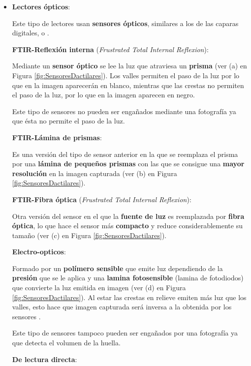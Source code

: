 \begin{itemize}
    \item 
    \textbf{Lectores ópticos}:
    
    Este tipo de lectores usan \textbf{sensores ópticos}, similares a los de las caparas digitales, \textbf{} o \textbf{}.
    
    \textbf{FTIR-Reflexión interna} (\textit{Frustrated Total Internal Reflexion}):
    
    Mediante un \textbf{sensor óptico} se lee la luz que atraviesa un \textbf{prisma} (ver (a) en Figura \ref{fig:SensoresDactilares}). Los valles permiten el paso de la luz por lo que en la imagen aparecerán en blanco, mientras que las crestas no permiten el paso de la luz, por lo que en la imagen aparecen en negro.
    
    Este tipo de sensores no pueden ser engañados mediante una fotografía ya que ésta no permite el paso de la luz. 
    
    \textbf{FTIR-Lámina de prismas}:
    
    Es una versión del tipo de sensor anterior en la que se reemplaza el prisma por una \textbf{lámina de pequeños prismas} con las que se consigue una \textbf{mayor resolución} en la imagen capturada (ver (b) en Figura \ref{fig:SensoresDactilares}).
      
    \textbf{FTIR-Fibra óptica} (\textit{Frustrated Total Internal Reflexion}):
    
    Otra versión del sensor \textbf{} en el que la \textbf{fuente de luz} es reemplazada por \textbf{fibra óptica}, lo que hace el sensor más \textbf{compacto} y reduce considerablemente su tamaño (ver (c) en Figura \ref{fig:SensoresDactilares}). 
    
    \textbf{Electro-opticos}:
    
    Formado por un \textbf{polímero sensible} que emite luz dependiendo de la \textbf{presión} que se le aplica y una \textbf{lamina fotosensible} (lamina de fotodiodos) que convierte la luz emitida en imagen  (ver (d) en Figura \ref{fig:SensoresDactilares}). Al estar las crestas en relieve emiten más luz que los valles, esto hace que imagen capturada será inversa a la obtenida por los sensores \textbf{}.  
    
    Este tipo de sensores tampoco pueden ser engañados por una fotografía ya que detecta el volumen de la huella.   
    
    \textbf{De lectura directa}:
    

\end{itemize}
